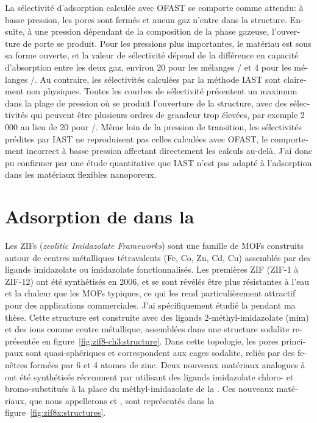 \documentclass[thesis]{subfiles}
\begin{document}
\begin{otherlanguage}{french}
La sélectivité d'adsorption calculée avec OFAST se comporte comme attendu: à
basse pression, les pores sont fermés et aucun gaz n'entre dans la structure.
Ensuite, à une pression dépendant de la composition de la phase gazeuse,
l'ouverture de porte se produit. Pour les pressions plus importantes, le
matériau est sous sa forme ouverte, et la valeur de sélectivité dépend de la
différence en capacité d'absorption entre les deux gaz, environ 20 pour les
mélanges / et 4 pour les mélanges /. Au contraire,
les sélectivités calculées par la méthode IAST sont clairement non physiques.
Toutes les courbes de sélectivité présentent un maximum dans la plage de
pression où se produit l'ouverture de la structure, avec des sélectivités qui
peuvent être plusieurs ordres de grandeur trop élevées, par exemple 2 000 au
lieu de 20 pour /. Même loin de la pression de transition, les
sélectivités prédites par IAST ne reproduisent pas celles calculées avec OFAST,
le comportement incorrect à basse pression affectant directement les calculs
au-delà. J'ai donc pu confirmer par une étude quantitative que IAST n'est pas
adapté à l'adsorption dans les matériaux flexibles nanoporeux.

\clearpage
\section{Adsorption de  dans la }

Les ZIFs (\emph{zeolitic Imidazolate Frameworks}) sont une famille de MOFs
construits autour de centres métalliques tétravalents (Fe, Co, Zn, Cd, Cu)
assemblés par des ligands imidazolate ou imidazolate fonctionnalisés. Les
premières ZIF (ZIF-1 à ZIF-12) ont été synthétisés en 2006\cite{Park2006}, et se
sont révélés être plus résistantes à l'eau et la chaleur que les MOFs typiques,
ce qui les rend particulièrement attractif pour des applications commerciales.
J'ai spécifiquement étudié la  pendant ma thèse. Cette structure est
construite avec des ligands 2-méthyl-imidazolate (mim) et des ions 
comme centre métallique, assemblées dans une structure sodalite représentée en
figure~\ref{fig:zif8-ch3:structure}. Dans cette topologie, les pores principaux
sont quasi-sphériques et correspondent aux cages sodalite, reliés par des
fenêtres formées par 6 et 4 atomes de zinc. Deux nouveaux matériaux analogues à
 ont été synthétisés récemment par \citeauthor{Li2009}\cite{Li2009}
utilisant des ligands imidazolate chloro- et bromo-substitués à la place du
méthyl-imidazolate de la . Ces nouveaux matériaux, que nous appellerons
\ZIFCl et \ZIFBr, sont représentés dans la figure~\ref{fig:zif8x:structures}.


\end{otherlanguage}
\end{document}

